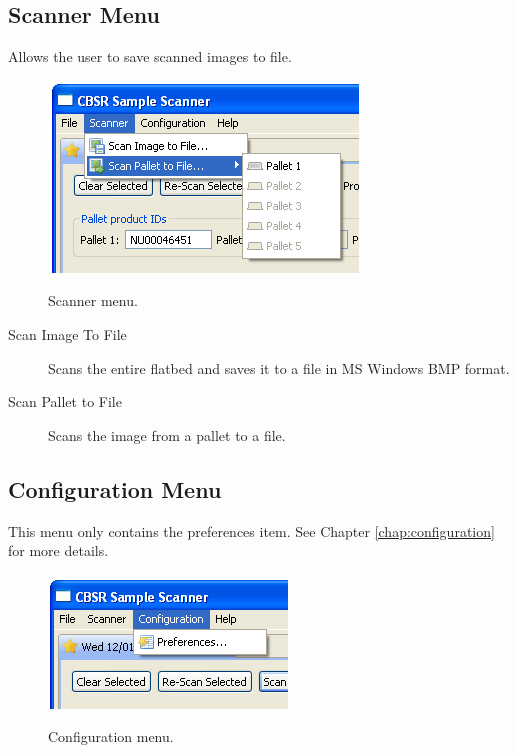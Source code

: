 \subsection{Scanner Menu}
Allows the user to save scanned images to file.
\begin{figure}[H]
  \centering
  \scalebox{0.5}
	   { \includegraphics*{screenshots/overview/scanner_menu} }
	   \caption{Scanner menu.}
	   \label{fig:scanner_menu}
\end{figure}
\begin{description}
\item[Scan Image To File] Scans the entire flatbed and saves it to a file in MS
  Windows BMP format.
\item[Scan Pallet to File] Scans the image from a pallet to a file.
\end{description}

\subsection{Configuration Menu}
This menu only contains the preferences item. See Chapter
\ref{chap:configuration} for more details.
\begin{figure}[H]
  \centering
  \scalebox{0.5}
	   { \includegraphics*{screenshots/overview/configuration_menu} }
	   \caption{Configuration menu.}
	   \label{fig:configuration_menu}
\end{figure}

